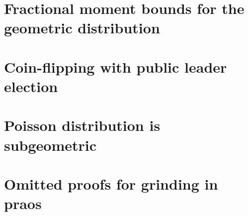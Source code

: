 \documentclass{article}
\begin{document}



\appendix
% 

\section{Fractional moment bounds for the geometric distribution}
\label{app:geometric}



\section{Coin-flipping with public leader election}
\label{app:bernoulli}



\section{Poisson distribution is subgeometric}
\label{app:poisson}



% 

\section{Omitted proofs for grinding in praos}
\label{app:grinding-praos}




% 



%
\end{document}
